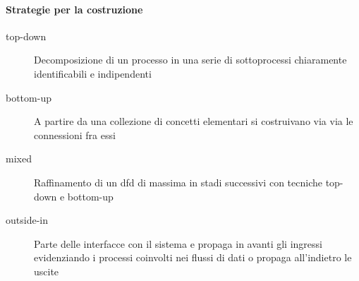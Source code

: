 \paragraph{Strategie per la costruzione}\label{par:dfd_strategie_per_la_costruzione} %
\begin{description}
    \item[top-down] Decomposizione di un processo in una serie di sottoprocessi chiaramente identificabili e indipendenti
    \item[bottom-up] A partire da una collezione di concetti elementari si costruivano via via le connessioni fra essi
    \item[mixed] Raffinamento di un \ac{dfd} di massima in stadi successivi con tecniche top-down e bottom-up
    \item[outside-in] Parte delle interfacce con il sistema e propaga in avanti gli ingressi evidenziando i processi coinvolti nei flussi di dati o propaga all'indietro le uscite
\end{description}
